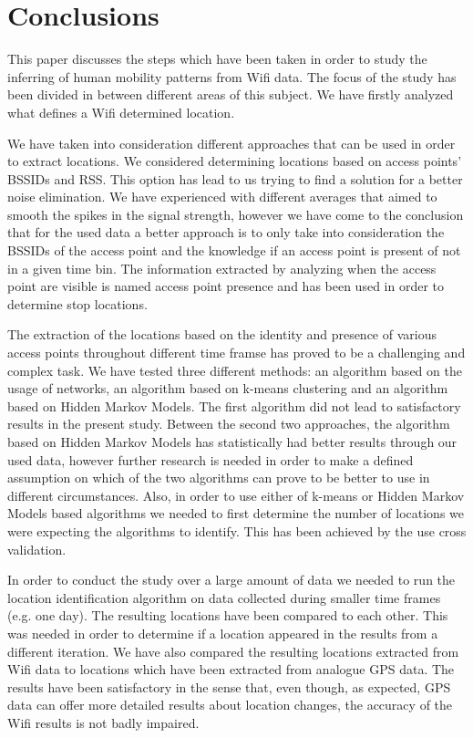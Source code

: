 \chapter{Conclusions}

This paper discusses the steps which have been taken in order to study the
inferring of human mobility patterns from Wifi data. The focus of the study has
been divided in between different areas of this subject. We have firstly
analyzed what defines a Wifi determined location. 

We have taken into consideration different approaches that can be used in order
to extract locations. We considered determining locations based on access
points' BSSIDs and RSS. This option has lead to us trying to find a solution for
a better noise elimination. We have experienced with different averages that
aimed to smooth the spikes in the signal strength, however we have come to the
conclusion that for the used data a better approach is to only take into
consideration the BSSIDs of the access point and the knowledge if an access
point is present of not in a given time bin. The information extracted by
analyzing when the access point are visible is named access point presence and
has been used in order to determine stop locations.

The extraction of the locations based on the identity and presence of various
access points throughout different time framse has proved to be a challenging
and complex task. We have tested three different methods: an algorithm based on
the usage of networks, an algorithm based on k-means clustering and an algorithm
based on Hidden Markov Models. The first algorithm did not lead to satisfactory
results in the present study. Between the second two approaches, the algorithm
based on Hidden Markov Models has statistically had better results through our
used data, however further research is needed in order to make a defined
assumption on which of the two algorithms can prove to be better to use in
different circumstances. Also, in order to use either of k-means or Hidden
Markov Models based algorithms we needed to first determine the number of
locations we were expecting the algorithms to identify. This has been achieved
by the use cross validation.

In order to conduct the study over a large amount of data we needed to run the
location identification algorithm on data collected during smaller time frames
(e.g. one day). The resulting locations have been compared to each other. This
was needed in order to determine if a location appeared in the results from a
different iteration. We have also compared the resulting locations extracted
from Wifi data to locations which have been extracted from analogue GPS data.
The results have been satisfactory in the sense that, even though, as expected,
GPS data can offer more detailed results about location changes, the accuracy
of the Wifi results is not badly impaired.

